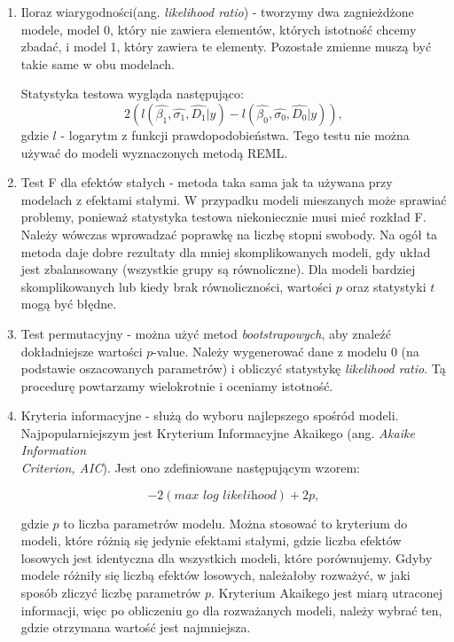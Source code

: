 \documentclass[12pt]{mwbk}
\theoremstyle{plain}
\theoremstyle{definition}
\theoremstyle{remark}
\begin{document}
\begin{enumerate}
	\item Iloraz wiarygodności(ang. \textit{likelihood ratio}) - tworzymy dwa zagnieżdżone modele, model 0, który nie zawiera elementów, których istotność chcemy zbadać, i model 1, który zawiera te elementy. Pozostałe zmienne muszą być takie same w obu modelach.
	
	Statystyka testowa wygląda następująco:
	$$2(l(\hat{\beta_1}, \hat{\sigma_1}, \hat{D_1}|y)-l(\hat{\beta_0}, \hat{\sigma_0}, \hat{D_0}|y)),$$
	gdzie $l$ - logarytm z funkcji prawdopodobieństwa. Tego testu nie można używać do modeli wyznaczonych metodą REML.
	
	\item Test F dla efektów stałych - metoda taka sama jak ta używana przy modelach z efektami stałymi. W przypadku modeli mieszanych może sprawiać problemy, ponieważ statystyka testowa niekoniecznie musi mieć rozkład F. Należy wówczas wprowadzać poprawkę na liczbę stopni swobody. Na ogół ta metoda daje dobre rezultaty dla mniej skomplikowanych modeli, gdy układ jest zbalansowany (wszystkie grupy są równoliczne). Dla modeli bardziej skomplikowanych lub kiedy brak równoliczności, wartości $p$ oraz statystyki $t$ mogą być błędne.
	
	\item Test permutacyjny - można użyć metod \textit{bootstrapowych}, aby znaleźć dokładniejsze wartości $p$-value. Należy wygenerować dane z modelu 0 (na podstawie oszacowanych parametrów) i obliczyć statystykę \textit{likelihood ratio}. Tą procedurę powtarzamy wielokrotnie i oceniamy istotność.
	

	\item Kryteria informacyjne - służą do wyboru najlepszego spośród modeli. Najpopularniejszym jest Kryterium Informacyjne Akaikego (ang. \textit{Akaike Information \\Criterion, AIC}). Jest ono zdefiniowane następującym wzorem:
	
	$$-2(\textit{max log likelihood})+ 2p,$$
	
	gdzie $p$ to liczba parametrów modelu. Można stosować to kryterium do modeli, które różnią się jedynie efektami stałymi, gdzie liczba efektów losowych jest identyczna dla wszystkich modeli, które porównujemy. Gdyby modele różniły się liczbą efektów losowych, należałoby rozważyć, w jaki sposób zliczyć liczbę parametrów $p$. Kryterium Akaikego jest miarą utraconej informacji, więc po obliczeniu go dla rozważanych modeli, należy wybrać ten, gdzie otrzymana wartość jest najmniejsza.

\end{enumerate}
\end{document}
